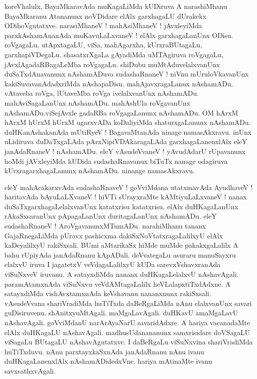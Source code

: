 \documentclass{article}
\begin{document}
\begin{mn}%
koreVhalulx, BayaMkaravAda muKagaLiMda kUDiruva A narashiMhanu BayaMkaranu Atananunx  noVDidare 
elAlx garxhagaLU dUrakekx ODihoVgutatxve. narasiMhaneV ! mahAsiMhaneV ! jAvxleyiMda 
parxkAshamAnanAda muKavuLaLxvaneV ! elAlx garxhagaLanUnx ODisu. roVgagaLu, utApxtagaLU, viSa, 
mahAgarxha, kUrxraBUtagaLu, garxhapiVDegaLu. shasatxrXgaLa gAyadiMda uMTAgiruva  roVgagaLu, 
jAvxlAgadaRBagaLeMba roVgagaLu. shiDubu muMtAduvelalxvanUnx duSaTxdAnavanunx nAshamADuva 
sudashaRnaneV ! niVnu mUruloVkavanUnx kakiSuvavanAdadxriMda nAshapaDisu. mahAjavxragaLanux 
nAshamADu. vAtaveba roVga, lUtaveMba roVga ivelalxvanUnx nAshamADu. mahAviSagaLanUnx nAshamADu. 
mahAshUla roVgavanUnx nAshamADu.viSejAvxle gadaRBa roVgagaLanunx nAshamADu. OM hArxM hArxM hUrxM 
hUrxM ugarxvADa koDaliyiMda shaturxgaLanunx nAshamADu. duHKanAshakanAda mUtiRyeV ! BagavaMtanAda 
ninage namasAkxravu. inUnx uLidiruva duDaTxgaLAda pArxNipiVDAkaragaLAda garxhagaLanenxlAlx eleY 
janAdaRnaneV ! nAshamADu. eleY vAsudeVvaneV ! yAvudAdarU rUpavanunx hoMdi jAVxleyiMda kUDida 
sudashaRnavanux biTuTx nanage odagiruva kUrxragarxhagaLanunx nAshamADu. ninange namasAkxravu.
\end{mn}

\begin{mn}%
eleY mahAcakarxvAda sudashaRnaveV ! goVviMdana utatxmavAda AyudhaveV ! haritavAda bAyuLaLXvaneV ! 
hiVTi sUrayxraMte kAMtiyuLaLxvaneV ! nanax duSaTxgarxhagaLelalxvanUnx katatxrisu katatxrisu. elAlx 
duHKagaLanUnx rAkaSxsaranUnx pApagaLanUnx duritagaLanUnx nAshamADu. eleY sudashaRnaneV ! 
AroVgavanunxMTumADu. narahiMhanu tananx GajaRnegaLiMda pUravx pashicxma dakiSxNoVtatxragaLalilxyU 
elAlx kaDeyalilxyU rakiSxsali. BUmi aMtarikaSx hiMde muMde pakakxgaLalilx A bahu rUpiyAda 
janAdaRnanu kApADali. deVvategaLu asuraru manuSayxru elalxvU iruva I jagatetxV veVdagaLalilxyU 
kUDa sarevxVshavxranAda viSuNxveV iruvanu. A satayxdiMda nananx duHKagaLelalxvU nAshavAgali. 
paramAtamxnAda viSuNxvu veVdAMtagaLalilx heVLalapxtiTxdAdxne. A satayxdiMda vishAvxtamxnAda 
keVshavanu nananxnunx rakiSxsali. vAsudeVvana shariVradiMda huTiTxda daBeRgaLiMda nAnu elalxvanUnx 
savari guDisiruvenu. shAnitxyuMtAgali. maMgaLavAgali. duHKavU amaMgaLavU nAshavAgali. goVviMdanU 
narArAyaNarU savaridAdxre. A hariya vacanadaMte elAlx duHKagaLU nAshavAgali. madhusUdanananunx 
samxrisidare doVSagaLU viSagaLu BUtagaLU nAshavAgutatxve. I daBeRgaLu viSuNxvina shariVradiMda 
huTiTxduvu. nAnu parxtayxkaSxnAda janAdaRnanu nAnu ivanu duHKagaLanenxlAlx nAshamADidedxVne. 
hariya mAtinaMte ivanu savxsathxvAgali.
\end{mn}
\end{document}
